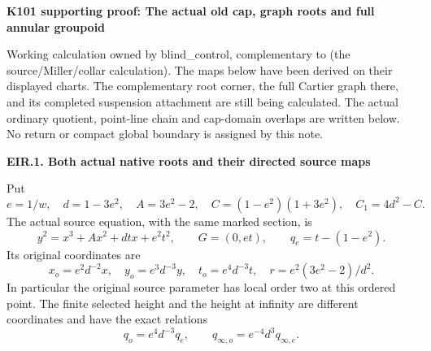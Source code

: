\par\bigskip\noindent\textbf{K101 supporting proof: The actual old cap, graph roots and full annular groupoid}\par\nobreak
Working calculation owned by blind\_control, complementary to
 (the source/Miller/collar calculation).
The maps below have been derived on their displayed charts. The complementary
root corner, the full Cartier graph there, and its completed suspension
attachment are still being calculated. The actual ordinary quotient,
point-line chain and cap-domain overlaps are written below. No return
or compact global boundary is assigned by this note.

\par

\medskip\noindent\textbf{EIR.1. Both actual native roots and their directed source maps}

\par\nobreak

Put
\[
 e=1/w,\quad d=1-3e^2,\quad A=3e^2-2,\quad
 C=(1-e^2)(1+3e^2),\quad C_1=4d^2-C.
\]
The actual source equation, with the same marked section, is
\[
 y^2=x^3+Ax^2+dtx+e^2t^2,\qquad G=(0,et),\qquad
 q_e=t-(1-e^2).
 \tag{EIR.1}
\]
Its original coordinates are
\[
 x_o=e^2d^{-2}x,\quad y_o=e^3d^{-3}y,\quad
 t_o=e^4d^{-3}t,\quad r=e^2(3e^2-2)/d^2.
 \tag{EIR.2}
\]
In particular the original source parameter has local order two at this
ordered point. The finite selected height and the height at infinity are
different coordinates and have the exact relations
\[
 q_o=e^4d^{-3}q_e,\qquad q_{\infty,o}=e^{-4}d^3q_{\infty,e}.
 \tag{EIR.3}
\]

